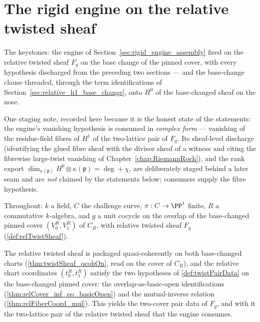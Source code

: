 \section{The rigid engine on the relative twisted sheaf}
\label{sec:rel_twist_rigid_engine}

The keystones: the engine of Section~\ref{sec:rigid_engine_assembly} fired on the
relative twisted sheaf \(F_g\) on the base change of the pinned cover, with every
hypothesis discharged from the preceding two sections --- and the base-change clause
threaded, through the term identifications of Section~\ref{sec:relative_h1_base_change},
onto \(H^0\) of the base-changed sheaf on the nose.

One staging note, recorded here because it is the honest state of the statements: the
engine's vanishing hypothesis is consumed in \emph{complex form} --- vanishing of the
residue-field fibres of \(H^1\) of the two-lattice pair of \(F_g\). Its sheaf-level
discharge (identifying the glued fibre sheaf with the divisor sheaf of a witness and
citing the fibrewise large-twist vanishing of Chapter~\ref{chap:RiemannRoch}), and the
rank export \(\dim_{\kappa(\mathfrak p)} H^0 \otimes \kappa(\mathfrak p) = \deg +
\chi\), are deliberately staged behind a later seam and are \emph{not} claimed by the
statements below; consumers supply the fibre hypothesis.

Throughout: \(k\) a field, \(C\) the challenge curve, \(\pi : C \to \PP^1\) finite,
\(R\) a commutative \(k\)-algebra, and \(g\) a unit cocycle on the overlap of the
base-changed pinned cover \((V_0^R, V_1^R)\) of \(C_R\), with relative twisted sheaf
\(F_g\) (\ref{def:relTwistSheaf}).

\begin{definition}
  \label{def:relTwistPairData}
  \leanok
  The relative twisted sheaf is packaged quasi-coherently on both base-changed charts
  (\ref{thm:twistSheaf_qcohOn}, read on the cover of \(C_R\)), and the relative chart
  coordinates \((t_0^R, t_1^R)\) satisfy the two hypotheses of \ref{def:twistPairData}
  on the base-changed pinned cover: the overlap-as-basic-open identifications
  (\ref{thm:relCover_inf_eq_basicOpen}) and the mutual-inverse relation
  (\ref{thm:relFiberCoord_mul}). This yields the two-cover pair data of \(F_g\), and
  with it the two-lattice pair of the relative twisted sheaf that the engine consumes.
\end{definition}

